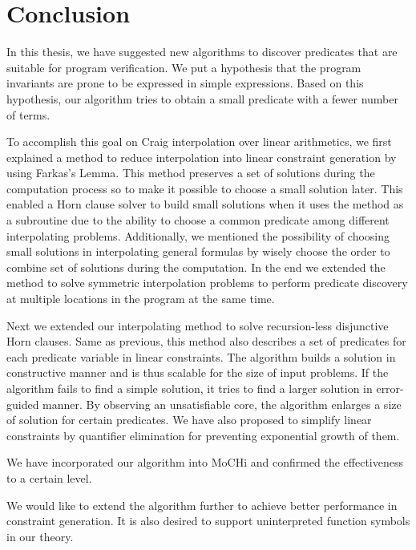 \chapter{Conclusion}
\label{chap:conclusion}

In this thesis, we have suggested new algorithms to discover
predicates that are suitable for program verification.  We put a
hypothesis that the program invariants are prone to be expressed in
simple expressions.  Based on this hypothesis, our algorithm tries to
obtain a small predicate with a fewer number of terms.

To accomplish this goal on Craig interpolation over linear
arithmetics, we first explained a method to reduce interpolation into
linear constraint generation by using Farkas's Lemma.  This method
preserves a set of solutions during the computation process so to make
it possible to choose a small solution later. This enabled a Horn
clause solver to build small solutions when it uses the method as a
subroutine due to the ability to choose a common predicate among
different interpolating problems. Additionally, we mentioned the
possibility of choosing small solutions in interpolating general
formulas by wisely choose the order to combine set of solutions during
the computation. In the end we extended the method to solve symmetric
interpolation problems to perform predicate discovery at multiple
locations in the program at the same time.

Next we extended our interpolating method to solve recursion-less
disjunctive Horn clauses.  Same as previous, this method also
describes a set of predicates for each predicate variable in linear
constraints.  The algorithm builds a solution in constructive manner
and is thus scalable for the size of input problems. If the algorithm
fails to find a simple solution, it tries to find a larger solution in
error-guided manner.  By observing an unsatisfiable core, the
algorithm enlarges a size of solution for certain predicates.  We have
also proposed to simplify linear constraints by quantifier elimination
for preventing exponential growth of them.

We have incorporated our algorithm into MoCHi and confirmed the
effectiveness to a certain level.

We would like to extend the algorithm further to achieve better
performance in constraint generation.  It is also desired to support
uninterpreted function symbols in our theory.

